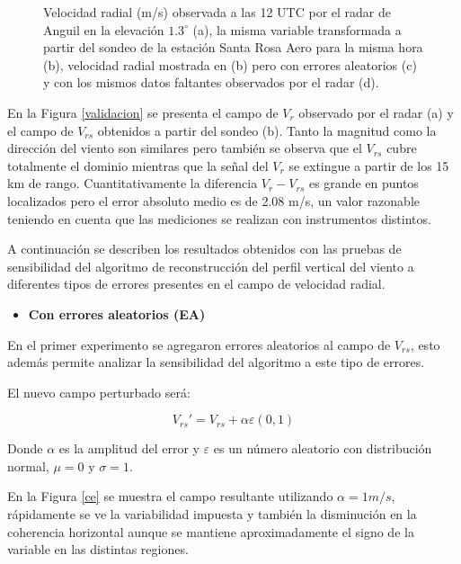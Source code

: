 \documentclass[12pt,spanish,oneside, a4paper]{book}
\providecommand{\tightlist}{%
  \setlength{\itemsep}{0pt}\setlength{\parskip}{0pt}}
\begin{document}
\begin{figure}
{}

\caption{Velocidad radial (m/s) observada a las 12 UTC por el radar de Anguil en la elevación $1.3^{\circ}$ (a), la misma variable transformada a partir del sondeo de la estación Santa Rosa Aero para la misma hora (b), velocidad radial mostrada en (b) pero con errores aleatorios (c) y con los mismos datos faltantes observados por el radar (d). \label{validacion}}\label{fig:validacion}
\end{figure}

En la Figura \ref{validacion} se presenta el campo de \(V_r\) observado
por el radar (a) y el campo de \(V_{rs}\) obtenidos a partir del sondeo
(b). Tanto la magnitud como la dirección del viento son similares pero
también se observa que el \(V_{rs}\) cubre totalmente el dominio
mientras que la señal del \(V_r\) se extingue a partir de los 15 km de
rango. Cuantitativamente la diferencia \(V_r - V_{rs}\) es grande en
puntos localizados pero el error absoluto medio es de 2.08 m/s, un valor
razonable teniendo en cuenta que las mediciones se realizan con
instrumentos distintos.

A continuación se describen los resultados obtenidos con las pruebas de
sensibilidad del algoritmo de reconstrucción del perfil vertical del
viento a diferentes tipos de errores presentes en el campo de velocidad
radial.

\begin{itemize}
\tightlist
\item
  \textbf{Con errores aleatorios (EA)}
\end{itemize}

En el primer experimento se agregaron errores aleatorios al campo de
\(V_{rs}\), esto además permite analizar la sensibilidad del algoritmo a
este tipo de errores.

El nuevo campo perturbado será:

\begin{equation} \label{eq-vr12}
V_{rs}'  = V_{rs} + \alpha \varepsilon(0,1)
\end{equation}

Donde \(\alpha\) es la amplitud del error y \(\varepsilon\) es un número
aleatorio con distribución normal, \(\mu = 0\) y \(\sigma= 1\).

En la Figura \ref{ce} se muestra el campo resultante utilizando
\(\alpha = 1 m/s\), rápidamente se ve la variabilidad impuesta y también
la disminución en la coherencia horizontal aunque se mantiene
aproximadamente el signo de la variable en las distintas regiones.
\end{document}

